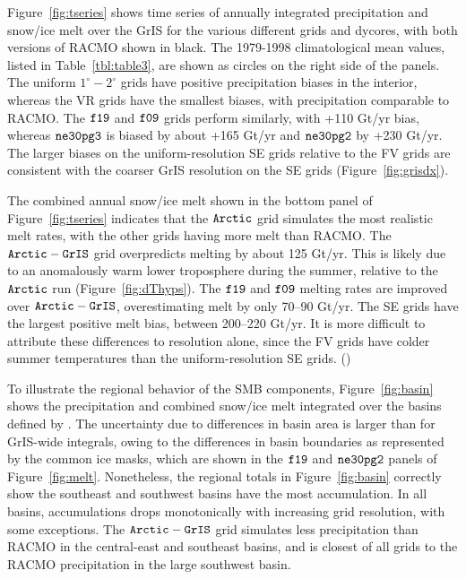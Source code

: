 \documentclass[draft]{agujournal2019}
\begin{document}
Figure~\ref{fig:tseries} shows time series of annually integrated precipitation and snow/ice melt over the GrIS for the various different grids and dycores, with both versions of RACMO shown in black. The 1979-1998 climatological mean values, listed in Table~\ref{tbl:table3}, are shown as circles on the right side of the panels. The uniform $1^{\circ}-2^{\circ}$ grids have positive precipitation biases in the interior, whereas the VR grids have the smallest biases, with precipitation comparable to RACMO. The $\tt f19$ and $\tt f09$ grids perform similarly, with +110 Gt/yr bias, whereas $\tt ne30pg3$ is biased by about +165 Gt/yr and $\tt ne30pg2$ by +230 Gt/yr. The larger biases on the uniform-resolution SE grids relative to the FV grids are consistent with the coarser GrIS resolution on the SE grids (Figure~\ref{fig:grisdx}).

The combined annual snow/ice melt shown in the bottom panel of Figure~\ref{fig:tseries} indicates that the $\tt Arctic$ grid simulates the most realistic melt rates, with the other grids having more melt than RACMO. The $\tt Arctic-GrIS$ grid overpredicts melting by about 125 Gt/yr. This is likely due to an anomalously warm lower troposphere during the summer, relative to the $\tt Arctic$ run (Figure~\ref{fig:dThyps}). The $\tt f19$ and $\tt f09$ melting rates are improved over $\tt Arctic-GrIS$, overestimating melt by only 70--90 Gt/yr. The SE grids have the largest positive melt bias, between 200--220 Gt/yr. It is more difficult to attribute these differences to resolution alone, since the FV grids have colder summer temperatures than the uniform-resolution SE grids. ({\color{blue}{Not sure I understand this sentence.  FV is both cooler and higher-resolution than SE, so one might suspect that cooler T is, in fact, connected to higher resolution.}})

To illustrate the regional behavior of the SMB components, Figure~\ref{fig:basin} shows the precipitation and combined snow/ice melt integrated over the basins defined by . The uncertainty due to differences in basin area is larger than for GrIS-wide integrals, owing to the differences in basin boundaries as represented by the common ice masks, which are shown in the $\tt f19$ and $\tt ne30pg2$ panels of Figure~\ref{fig:melt}. Nonetheless, the regional totals in Figure~\ref{fig:basin} correctly show the southeast and southwest basins have the most accumulation. In all basins, accumulations drops monotonically with increasing grid resolution, with some exceptions. The $\tt Arctic-GrIS$ grid simulates less precipitation than RACMO in the central-east and southeast basins, and is closest of all grids to the RACMO precipitation in the large southwest basin.
\end{document}
